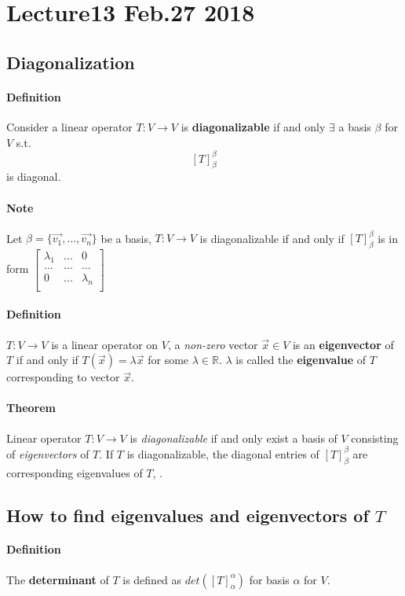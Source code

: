 \documentclass[11pt]{article}
\newcommand{\trans}[3]{{#1}: {#2} \to {#3}}
\newcommand{\R}[0]{\mathbb{R}}
\newcommand{\tmat}[3]{[{#1}]_{{#2}}^{{#3}}}
\newcommand{\vset}[3]{\{\vec{{#1}_{#2}}, \dots, \vec{{#1}_{#3}}\}}
\newcommand{\definition}[0]{\paragraph{Definition}}
\newcommand{\theorem}[0]{\paragraph{Theorem}}
\begin{document}
	\section{Lecture13 Feb.27 2018}
	\subsection{Diagonalization}
	\definition Consider a linear operator $\trans{T}{V}{V}$ is \textbf{diagonalizable} if and only $\exists$ a basis $\beta$ for $V$ s.t.
	\[
		\tmat{T}{\beta}{\beta}
	\] is diagonal.
	\paragraph{Note} Let $\beta = \vset{v}{1}{n}$ be a basis, $\trans{T}{V}{V}$ is diagonalizable if and only if $\tmat{T}{\beta}{\beta}$ is in form $\begin{bmatrix}
		\lambda_1 & ... & 0 \\
		... & ... & ... \\
		0 & ... & \lambda_n \\
	\end{bmatrix}$
	\definition $\trans{T}{V}{V}$ is a linear operator on $V$, a \emph{non-zero} vector $\vec{x} \in V$ is an \textbf{eigenvector} of $T$ if and only if $T(\vec{x}) = \lambda \vec{x}$ for some $\lambda \in \R$. $\lambda$ is called the \textbf{eigenvalue} of $T$ corresponding to vector $\vec{x}$.
	
	\theorem Linear operator $\trans{T}{V}{V}$ is \emph{diagonalizable} if and only exist a basis of $V$ consisting of \emph{eigenvectors} of $T$. If $T$ is diagonalizable, the diagonal entries of $\tmat{T}{\beta}{\beta}$ are corresponding eigenvalues of $T$, .
	
	\subsection{How to find eigenvalues and eigenvectors of $T$}
	\definition The \textbf{determinant} of $T$ is defined as $det(\tmat{T}{\alpha}{\alpha})$ for  basis $\alpha$ for $V$.
\end{document}
